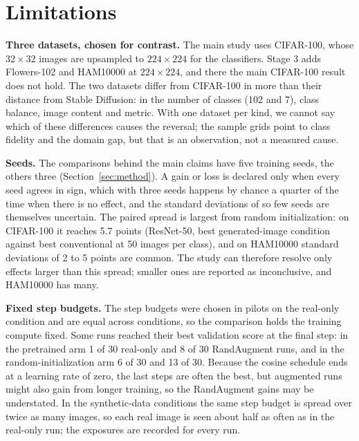 \section{Limitations}
\label{sec:limitations}


\textbf{Three datasets, chosen for contrast.} The main study uses CIFAR-100, whose $32\times32$ images are upsampled to $224\times224$ for the classifiers. Stage 3 adds Flowers-102 and HAM10000 at $224\times224$, and there the main CIFAR-100 result does not hold. The two datasets differ from CIFAR-100 in more than their distance from Stable Diffusion: in the number of classes (102 and 7), class balance, image content and metric. With one dataset per kind, we cannot say which of these differences causes the reversal; the sample grids point to class fidelity and the domain gap, but that is an observation, not a measured cause.

\textbf{Seeds.} The comparisons behind the main claims have five training seeds, the others three (Section~\ref{sec:method}). A gain or loss is declared only when every seed agrees in sign, which with three seeds happens by chance a quarter of the time when there is no effect, and the standard deviations of so few seeds are themselves uncertain. The paired spread is largest from random initialization: on CIFAR-100 it reaches 5.7 points (ResNet-50, best generated-image condition against best conventional at 50 images per class), and on HAM10000 standard deviations of 2 to 5 points are common. The study can therefore resolve only effects larger than this spread; smaller ones are reported as inconclusive, and HAM10000 has many.

\textbf{Fixed step budgets.} The step budgets were chosen in pilots on the real-only condition and are equal across conditions, so the comparison holds the training compute fixed. Some runs reached their best validation score at the final step: in the pretrained arm 1 of 30 real-only and 8 of 30 RandAugment runs, and in the random-initialization arm 6 of 30 and 13 of 30. Because the cosine schedule ends at a learning rate of zero, the last steps are often the best, but augmented runs might also gain from longer training, so the RandAugment gains may be understated. In the synthetic-data conditions the same step budget is spread over twice as many images, so each real image is seen about half as often as in the real-only run; the exposures are recorded for every run.

